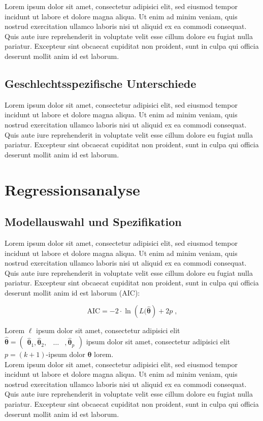 \documentclass[12pt, a4paper, oneside]{article}
\begin{document}
%
Lorem ipsum dolor sit amet, consectetur adipisici elit, sed eiusmod tempor incidunt ut labore et dolore magna aliqua. Ut enim ad minim veniam, quis nostrud exercitation ullamco laboris nisi ut aliquid ex ea commodi consequat. Quis aute iure reprehenderit in voluptate velit esse cillum dolore eu fugiat nulla pariatur. Excepteur sint obcaecat cupiditat non proident, sunt in culpa qui officia deserunt mollit anim id est laborum.

\subsection{Geschlechtsspezifische Unterschiede}
Lorem ipsum dolor sit amet, consectetur adipisici elit, sed eiusmod tempor incidunt ut labore et dolore magna aliqua. Ut enim ad minim veniam, quis nostrud exercitation ullamco laboris nisi ut aliquid ex ea commodi consequat. Quis aute iure reprehenderit in voluptate velit esse cillum dolore eu fugiat nulla pariatur. Excepteur sint obcaecat cupiditat non proident, sunt in culpa qui officia deserunt mollit anim id est laborum.

\section{Regressionsanalyse}
\subsection{Modellauswahl und Spezifikation}
Lorem ipsum dolor sit amet, consectetur adipisici elit, sed eiusmod tempor incidunt ut labore et dolore magna aliqua. Ut enim ad minim veniam, quis nostrud exercitation ullamco laboris nisi ut aliquid ex ea commodi consequat. Quis aute iure reprehenderit in voluptate velit esse cillum dolore eu fugiat nulla pariatur. Excepteur sint obcaecat cupiditat non proident, sunt in culpa qui officia deserunt mollit anim id est laborum (\ac{AIC}):

\begin{equation*}
\text{AIC}=-2\cdot \ln \left(L(\hat{\boldsymbol{\theta}}\right)+2p\;,
\end{equation*}

Lorem $\ell$ ipsum dolor sit amet, consectetur adipisici elit $\hat{\boldsymbol{\theta}}=\begin{pmatrix} \hat{\mathbf{\theta}}_1,\hat{\mathbf{\theta}}_2, & \ldots &, \hat{\mathbf{\theta}}_p\end{pmatrix}$ ipsum dolor sit amet, consectetur adipisici elit $p=(k+1)$-ipsum dolor $\boldsymbol{\theta}$ lorem.\\ Lorem ipsum dolor sit amet, consectetur adipisici elit, sed eiusmod tempor incidunt ut labore et dolore magna aliqua. Ut enim ad minim veniam, quis nostrud exercitation ullamco laboris nisi ut aliquid ex ea commodi consequat. Quis aute iure reprehenderit in voluptate velit esse cillum dolore eu fugiat nulla pariatur. Excepteur sint obcaecat cupiditat non proident, sunt in culpa qui officia deserunt mollit anim id est laborum.
\end{document}
